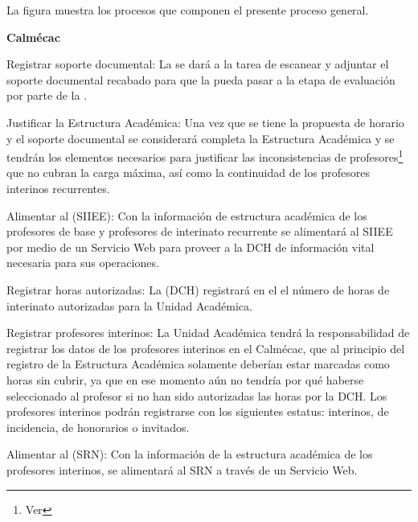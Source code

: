 	La figura  muestra los procesos que componen el presente proceso general.



\begin{PDescripcion}
	
		\Ppaso \textbf{Calmécac}
	\begin{enumerate}
		\Ppaso[\PSubProceso] Registrar soporte documental: La  se dará a la tarea de escanear y adjuntar el soporte documental recabado para que la  pueda pasar a la etapa de evaluación por parte de la .
		
		\Ppaso[\itarea] Justificar la Estructura Académica: Una vez que se tiene la propuesta de horario y el soporte documental se considerará completa la Estructura Académica y se tendrán los elementos necesarios para justificar las inconsistencias de profesores\footnote{Ver } que no cubran la carga máxima, así como  la continuidad de los profesores interinos recurrentes.
		
		\Ppaso[\itarea] Alimentar al (SIIEE): Con la información de estructura académica de los profesores de base  y profesores de interinato recurrente se alimentará al SIIEE por medio de un Servicio Web para proveer a la DCH de información vital necesaria para sus operaciones.
		
		\Ppaso[\itarea] Registrar horas autorizadas: La (DCH) registrará en el  el número de horas de interinato autorizadas para la Unidad Académica. 
		
		\Ppaso[\itarea] Registrar profesores interinos: La Unidad Académica tendrá la responsabilidad de registrar los datos de los profesores interinos en el Calmécac, que al principio del registro de la Estructura Académica solamente deberían estar marcadas como horas sin cubrir, ya que en ese momento aún no tendría por qué haberse seleccionado al profesor si no han sido autorizadas las horas por la DCH. Los profesores interinos podrán registrarse con los siguientes estatus:  interinos, de incidencia, de honorarios o invitados.
		
		\Ppaso[\itarea] Alimentar al  (SRN): Con la información de la estructura académica de los profesores interinos, se alimentará al SRN a través de un Servicio Web.
	\end{enumerate}	


\end{PDescripcion}
